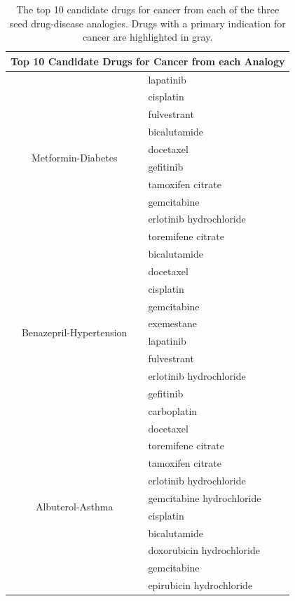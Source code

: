 \documentclass{article}
\newcommand{\lgc}[1]{\cellcolor[gray]{0.85}#1}
\begin{document}
\begin{table}[t!]
\footnotesize
\centering
\caption{The top 10 candidate drugs for cancer from each of the three seed drug-disease analogies. Drugs with a primary indication for cancer are highlighted in gray.}
\label{tab:drugs_val_cncr}
\begin{tabular}{c l}
\hline
\multicolumn{2}{c}{Top 10 Candidate Drugs for Cancer from each Analogy} \\
\hline
\multirow{10}{*}{Metformin-Diabetes} & \lgc{lapatinib} \\
& \lgc{cisplatin} \\
& \lgc{fulvestrant} \\
& \lgc{bicalutamide} \\
& \lgc{docetaxel} \\
& \lgc{gefitinib} \\
& \lgc{tamoxifen citrate} \\
& \lgc{gemcitabine} \\
& \lgc{erlotinib hydrochloride} \\
& \lgc{toremifene citrate} \\
\hline
\multirow{10}{*}{Benazepril-Hypertension} & \lgc{bicalutamide} \\
& \lgc{docetaxel} \\
& \lgc{cisplatin} \\
& \lgc{gemcitabine} \\
& \lgc{exemestane} \\
& \lgc{lapatinib} \\
& \lgc{fulvestrant} \\
& \lgc{erlotinib hydrochloride} \\
& \lgc{gefitinib} \\
& \lgc{carboplatin} \\
\hline
\multirow{10}{*}{Albuterol-Asthma} & \lgc{docetaxel} \\
& \lgc{toremifene citrate} \\
& \lgc{tamoxifen citrate} \\
& \lgc{erlotinib hydrochloride} \\
& \lgc{gemcitabine hydrochloride} \\
& \lgc{cisplatin} \\
& \lgc{bicalutamide} \\
& \lgc{doxorubicin hydrochloride} \\
& \lgc{gemcitabine} \\
& \lgc{epirubicin hydrochloride} \\
\hline
\end{tabular}
\end{table}
\end{document}
